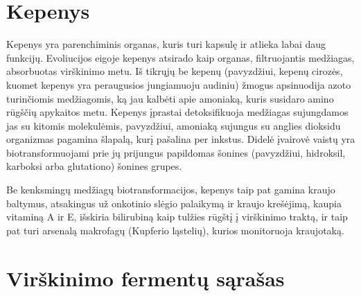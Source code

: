 \documentclass[]{book}
\begin{document}
\hypertarget{kepenys}{%
\section{Kepenys}\label{kepenys}}

Kepenys yra parenchiminis organas, kuris turi kapsulę ir atlieka labai daug funkcijų. Evoliucijos eigoje kepenys atsirado kaip organas, filtruojantis medžiagas, absorbuotas virškinimo metu. Iš tikrųjų be kepenų (pavyzdžiui, kepenų cirozės, kuomet kepenys yra peraugusios jungiamuoju audiniu) žmogus apsinuodija azoto turinčiomis medžiagomis, ką jau kalbėti apie amoniaką, kuris susidaro amino rūgščių apykaitos metu. Kepenys įprastai detoksifikuoja medžiagas sujungdamos jas su kitomis molekulėmis, pavyzdžiui, amoniaką sujungus su anglies dioksidu organizmas pagamina šlapalą, kurį pašalina per inkstus. Didelė įvairovė vaistų yra biotransformuojami prie jų prijungus papildomas šonines (pavyzdžiui, hidroksil, karboksi arba glutationo) šonines grupes.

Be kenksmingų medžiagų biotransformacijos, kepenys taip pat gamina kraujo baltymus, atsakingus už onkotinio slėgio palaikymą ir kraujo krešėjimą, kaupia vitaminą A ir E, išskiria bilirubiną kaip tulžies rūgštį į virškinimo traktą, ir taip pat turi arsenalą makrofagų (Kupferio ląstelių), kurios monitoruoja kraujotaką.

\hypertarget{virskinimo-fermentu-sarasas}{%
\section{Virškinimo fermentų sąrašas}\label{virskinimo-fermentu-sarasas}}
\end{document}
